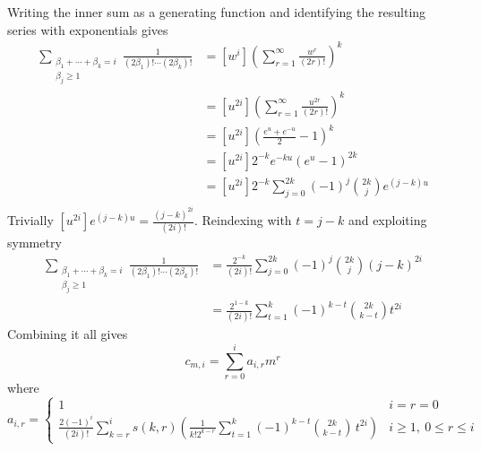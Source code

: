 \documentclass[a4paper]{amsart}
\begin{document}
Writing the inner sum as a generating function and identifying the resulting series with exponentials gives
\begin{align*}
\sum_{\substack{\beta_1+\cdots+\beta_k=i\\ \beta_j\ge 1}}
\frac{1}{(2\beta_1)!\cdots(2\beta_k)!}&=[w^i]\left(\sum_{r=1}^\infty\frac{w^r}{(2r)!}\right)^k\\
&=[u^{2i}]\left(\sum_{r=1}^\infty\frac{u^{2r}}{(2r)!}\right)^k\\
&=[u^{2i}]\left(\frac{e^{u}+e^{-u}}{2}-1\right)^k\\
&=[u^{2i}]2^{-k}e^{-ku}(e^u-1)^{2k}\\
&=[u^{2i}]2^{-k}\sum_{j=0}^{2k}(-1)^j\binom{2k}{j}e^{(j-k)u}\\
\end{align*}
Trivially $[u^{2i}]e^{(j-k)u}=\frac{(j-k)^{2i}}{(2i)!}$. Reindexing with $t=j-k$ and exploiting symmetry
\begin{align*}
\sum_{\substack{\beta_1+\cdots+\beta_k=i\\ \beta_j\ge 1}}
\frac{1}{(2\beta_1)!\cdots(2\beta_k)!}&=\frac{2^{-k}}{(2i)!}\sum_{j=0}^{2k}(-1)^j\binom{2k}{j}(j-k)^{2i}\\
&=\frac{2^{1-k}}{(2i)!}\sum_{t=1}^{k}(-1)^{k-t}\binom{2k}{k-t}t^{2i}
\end{align*}
Combining it all gives
\begin{equation*}
c_{m,i}=\sum_{r=0}^{i} a_{i,r}m^r
\end{equation*}
where
\begin{equation*}
a_{i,r}=
\begin{cases}
1 & i=r=0 \\
\frac{2(-1)^i}{(2i)!}\sum_{k=r}^{i} s(k,r) \left(\frac{1}{k!2^{k-r}}\sum_{t=1}^{k}(-1)^{k-t}\binom{2k}{k-t}\,t^{2i}\right) & i\geq 1,\:0\leq r\leq i
\end{cases}
\end{equation*}
\end{document}
